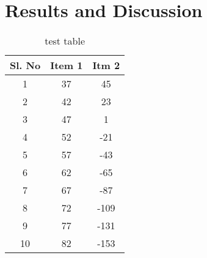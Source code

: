 \chapter{Results and Discussion}%

\lipsum[5-7] %

\begin{table}[h!]
	\centering
	\caption{test table}
	\vspace*{5pt}
	\begin{tabular}{|c|c|c|}
		\hline
		Sl. No & Item 1 & Itm 2 \\ \hline
		1      & 37     & 45    \\ \hline
		2      & 42     & 23    \\ \hline
		3      & 47     & 1     \\ \hline
		4      & 52     & -21   \\ \hline
		5      & 57     & -43   \\ \hline
		6      & 62     & -65   \\ \hline
		7      & 67     & -87   \\ \hline
		8      & 72     & -109  \\ \hline
		9      & 77     & -131  \\ \hline
		10     & 82     & -153  \\ \hline
	\end{tabular}
\end{table}